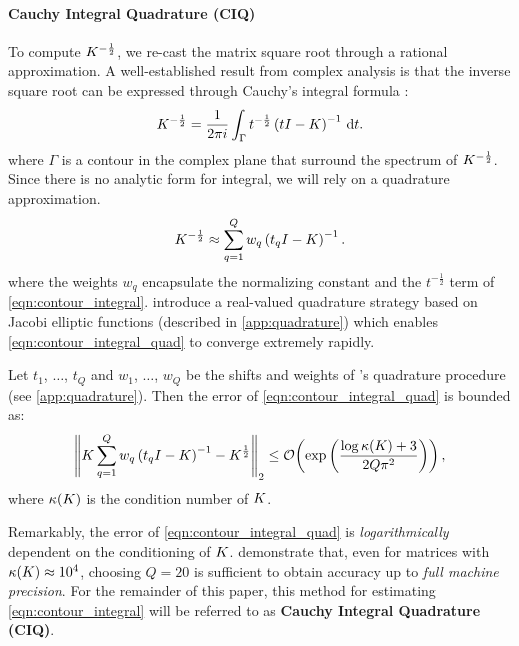 \paragraph{Cauchy Integral Quadrature (CIQ)}
To compute $K^{-\frac 1 2}$, we re-cast the matrix square root through a rational approximation.
A well-established result from complex analysis is that the inverse square root can be expressed through Cauchy's integral formula \citep{davies2005computing,higham2008functions,hale2008computing,golub2012matrix}:
%
\begin{equation}
	K^{-\frac 1 2} = \frac{1}{2 \pi i} \int_\Gamma t^{-\frac 1 2} \left( t I - K \right)^{-1} \,\mathrm{d}{t}.
	\label{eqn:contour_integral}
\end{equation}
%
where $\Gamma$ is a contour in the complex plane that surround the spectrum of $K^{-\frac 1 2}$.
Since there is no analytic form for integral, we will rely on a quadrature approximation.
%
\begin{equation}
	K^{-\frac 1 2} \approx \sum_{q=1}^Q w_q \left( t_q I - K \right)^{-1}.
	\label{eqn:contour_integral_quad}
\end{equation}
%
where the weights $w_q$ encapsulate the normalizing constant and the $t^{-\frac 1 2}$ term of \cref{eqn:contour_integral}.
\citet{hale2008computing} introduce a real-valued quadrature strategy based on Jacobi elliptic functions (described in \cref{app:quadrature}) which enables \cref{eqn:contour_integral_quad} to converge extremely rapidly.
%
\begin{lemma}
  Let $t_1$, $\ldots$, $t_Q$ and $w_1$, $\ldots$, $w_Q$ be the shifts and weights of \citet{hale2008computing}'s quadrature procedure (see \cref{app:quadrature}).
  Then the error of \cref{eqn:contour_integral_quad} is bounded as:
  \[
    \left\Vert \bK \sum_{q=1}^Q w_q \left( t_q \bI - \bK \right)^{-1} - \bK^{\frac 1 2} \right\Vert_2
    \leq \bigo{\exp\left( \frac {\log \kappa(\bK) + 3} {2 Q \pi^2} \right)},
  \]
  where $\kappa(K)$ is the condition number of $K$.
\label{lemma:hale}
\end{lemma}
%
Remarkably, the error of \cref{eqn:contour_integral_quad} is \emph{logarithmically} dependent on the conditioning of $K$.
\citeauthor{hale2008computing} demonstrate that, even for matrices with $\kappa(K) \approx 10^4$, choosing $Q = 20$ is sufficient to obtain accuracy up to \emph{full machine precision}.
For the remainder of this paper, this method for estimating \cref{eqn:contour_integral} will be referred to as {\bf Cauchy Integral Quadrature (CIQ)}.

